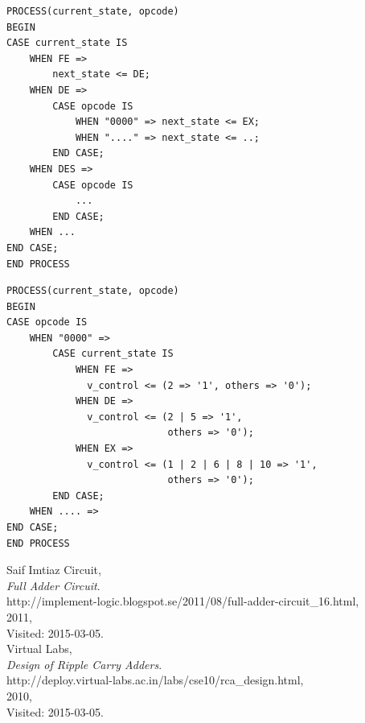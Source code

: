 \documentclass[a4paper,11pt]{article}
\begin{document}
\begin{appendix}
\newpage

\begin{lstlisting}[frame=single]
PROCESS(current_state, opcode)
BEGIN
CASE current_state IS
    WHEN FE =>
        next_state <= DE;
    WHEN DE =>
        CASE opcode IS
            WHEN "0000" => next_state <= EX;
            WHEN "...." => next_state <= ..;
        END CASE;
    WHEN DES =>
        CASE opcode IS
            ...
        END CASE;
    WHEN ...
END CASE;
END PROCESS    
\end{lstlisting}
\vspace{30pt}
\begin{lstlisting}[frame=single]
PROCESS(current_state, opcode)
BEGIN
CASE opcode IS
    WHEN "0000" =>
        CASE current_state IS
            WHEN FE =>
              v_control <= (2 => '1', others => '0');
            WHEN DE =>
              v_control <= (2 | 5 => '1', 
                            others => '0');
            WHEN EX =>
              v_control <= (1 | 2 | 6 | 8 | 10 => '1', 
                            others => '0');
        END CASE;
    WHEN .... =>
END CASE;
END PROCESS    
\end{lstlisting}
\vspace{25pt}

\newpage

\end{appendix}

\newpage
\begin{thebibliography}{9}
    Saif Imtiaz Circuit,\\
    \emph{Full Adder Circuit}.\\
    http://implement-logic.blogspot.se/2011/08/full-adder-circuit\_16.html,\\
    2011,\\
    Visited: 2015-03-05.\\

    Virtual Labs,\\
    \emph{Design of Ripple Carry Adders}.\\
    http://deploy.virtual-labs.ac.in/labs/cse10/rca\_design.html,\\
    2010,\\
    Visited: 2015-03-05.\\
\end{thebibliography}
\end{document}
